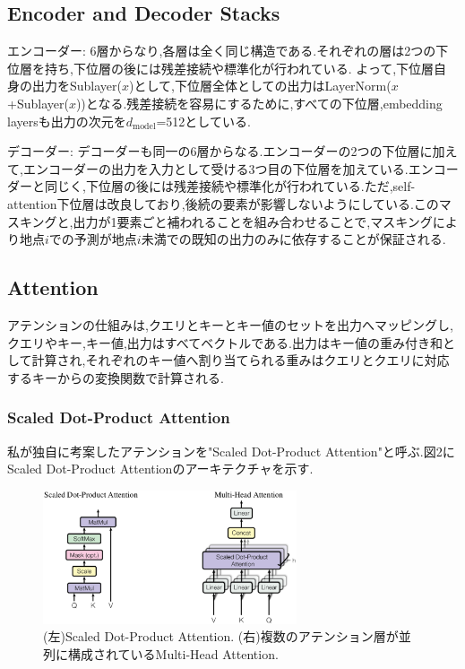 \documentclass[twocolumn]{jarticle}     %
\begin{document}
\subsection{Encoder and Decoder Stacks}
エンコーダー: 6層からなり,各層は全く同じ構造である.それぞれの層は2つの下位層を持ち,下位層の後には残差接続や標準化が行われている.
よって,下位層自身の出力をSublayer($x$)として,下位層全体としての出力はLayerNorm($x$+Sublayer($x$))となる.残差接続を容易にするために,すべての下位層,embedding layersも出力の次元を$d_\mathrm{model}$=512としている.\par
\par
デコーダー: デコーダーも同一の6層からなる.エンコーダーの2つの下位層に加えて,エンコーダーの出力を入力として受ける3つ目の下位層を加えている.エンコーダーと同じく,下位層の後には残差接続や標準化が行われている.ただ,self-attention下位層は改良しており,後続の要素が影響しないようにしている.このマスキングと,出力が1要素ごと補われることを組み合わせることで,マスキングにより地点$i$での予測が地点$i$未満での既知の出力のみに依存することが保証される.

\subsection{Attention}
アテンションの仕組みは,クエリとキーとキー値のセットを出力へマッピングし,クエリやキー,キー値,出力はすべてベクトルである.出力はキー値の重み付き和として計算され,それぞれのキー値へ割り当てられる重みはクエリとクエリに対応するキーからの変換関数で計算される.

\subsubsection{Scaled Dot-Product Attention}
私が独自に考案したアテンションを"Scaled Dot-Product Attention"と呼ぶ.図2にScaled Dot-Product Attentionのアーキテクチャを示す.\par

\begin{figure}[ht]
  \centering
  \includegraphics[width=75mm]{assets/Figure2.eps}

  \caption{(左)Scaled Dot-Product Attention. (右)複数のアテンション層が並列に構成されているMulti-Head Attention.}
  \label{Figure2}
\end{figure}
\end{document}
